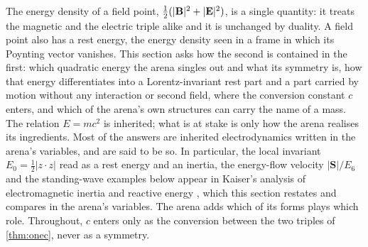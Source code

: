 The energy density of a field point, $\tfrac12(|\mathbf B|^2+|\mathbf E|^2)$, is a single quantity: it treats the magnetic and the electric triple
alike and it is unchanged by duality. A field point also has a rest energy, the energy density seen in a frame in which its Poynting vector
vanishes. This section asks how the second is contained in the first: which quadratic energy the arena singles out and what its symmetry is,
how that energy differentiates into a Lorentz-invariant rest part and a part carried by motion without any interaction or second field, where
the conversion constant $c$ enters, and which of the arena's own structures can carry the name of a mass. The relation $E=mc^2$
\cite{Einstein1905} is inherited; what is at stake is only how the arena realises its ingredients. Most of the answers are inherited
electrodynamics written in the arena's variables, and are said to be so. In particular, the local invariant $E_0=\tfrac12|z\cdot z|$ read as a
rest energy and an inertia, the energy-flow velocity $|\mathbf S|/E_6$ and the standing-wave examples below appear in Kaiser's analysis of
electromagnetic inertia and reactive energy \cite{Kaiser11}, which this section restates and compares in the arena's variables. The arena adds
which of its forms plays which role. Throughout, $c$
enters only as the conversion between the two triples of \cref{thm:onec}, never as a symmetry.

